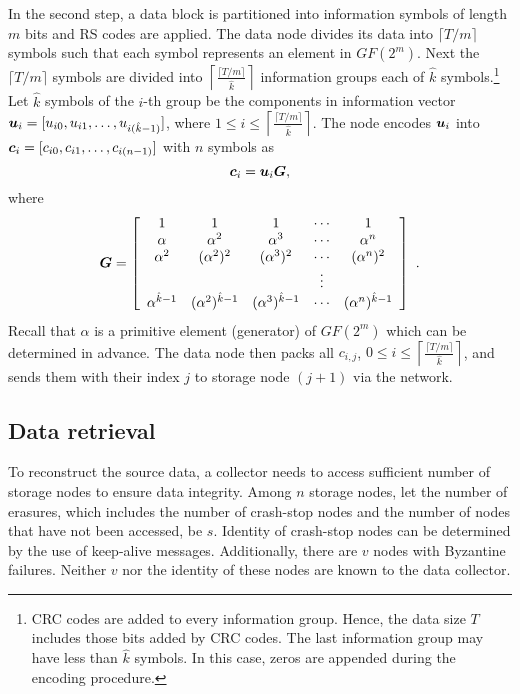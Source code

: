 \documentclass[10pt,journal,letterpaper,compsoc]{IEEEtran}
\newcommand{\bm}{\boldmath}
\newcommand{\cc}{\mbox{\bm $c$}}
\newcommand{\uu}{\mbox{\bm $u$}}
\newcommand{\0}{{\bf 0}}
\newcommand{\G}{\mbox{\bm $G$}}
\newcounter{step}
\begin{document}
In the second step, a data block is partitioned into information symbols of
length $m$ bits and RS codes are applied. The data node divides its
data into $\lceil T/m\rceil$ symbols such
that each symbol represents an element in $GF(2^m)$. Next 
the $\lceil T/m\rceil$ symbols are divided into $\left\lceil\frac{\lceil
T/m\rceil}{\hat{k}}\right\rceil$ information groups each of $\hat{k}$
symbols.\footnote{CRC codes are added to every information group. Hence, the data size $T$ includes those bits added by CRC codes. The last information group may have less than $\hat{k}$ symbols.
In this case, zeros are appended during the encoding procedure.} Let
$\hat{k}$ symbols of the $i$-th group be the
components in information vector
$\uu_i=[u_{i0},u_{i1},\ldots,u_{i(\hat{k}-1)}]$,
where $1\le i\le \left\lceil\frac{\lceil
T/m\rceil}{\hat{k}}\right\rceil$.   The node encodes $\uu_i$ into
$\cc_i=[c_{i0},c_{i1},\ldots,c_{i(n-1)}]$
with $n$ symbols as $$\cc_i=\uu_i\G,$$
where 
\begin{eqnarray}
\G=\left[\begin{array}{ccccc} 1&1&1&\cdots&1\\
\alpha&\alpha^2&\alpha^3&\cdots&\alpha^n\\
\alpha^2&(\alpha^2)^2&(\alpha^3)^2&\cdots&(\alpha^n)^2\\
&&&\vdots&\\
\alpha^{\hat{k}-1}&(\alpha^2)^{\hat{k}-1}&(\alpha^3)^{\hat{k}-1}&\cdots&(\alpha^n)^{\hat{k}-1}
\end{array}\right]~.
\label{eq:generator}
\end{eqnarray}
Recall that $\alpha$ is a primitive element (generator) of $GF(2^m)$ which can be
determined in advance. The data node then packs all $c_{i,j}$, $0\le
i\le \left\lceil\frac{\lceil T/m\rceil}{\hat{k}}\right\rceil$, and sends them with
their index $j$ to storage node $(j+1)$ via the network. 
\subsection{Data retrieval}
To reconstruct the source data, a collector needs to access sufficient number
of storage nodes to ensure data integrity. Among $n$ storage nodes, let the
number of erasures, which includes the number of crash-stop nodes and the
number of nodes that have not been accessed, be $s$. Identity of crash-stop
nodes can be determined by the use of keep-alive messages.  Additionally, there
are $v$ nodes with Byzantine failures. Neither $v$ nor the identity of these
nodes are known to the data collector. 
\end{document}

